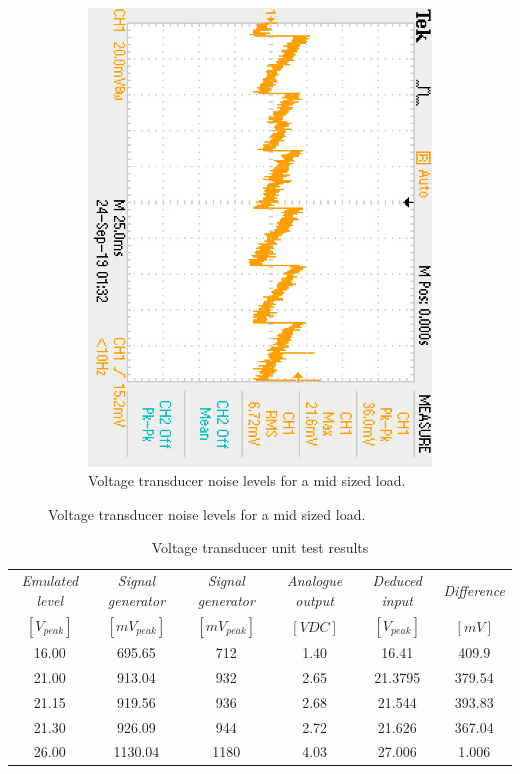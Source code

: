 \begin{figure}
\begin{subfigure}[]{0.45\textwidth}
  		\includegraphics[height=1\linewidth,angle=90]{./Figures/voltage_noise_measure}
		    \caption{Voltage transducer noise levels for a mid sized load.} \label{subfig:voltage_noise}
     \end{subfigure}
 \end{figure}
 
\begin{table}[h]
        \centering
        \footnotesize
        \caption{Voltage transducer unit test results}
         \begin{tabular}{cccccc}
          \toprule
             \textit{\footnotesize Emulated level} & \textit{\footnotesize Signal generator} & \textit{\footnotesize Signal generator} & \textit{{\footnotesize Analogue output}} & \textit{\footnotesize Deduced input} & \textit{\footnotesize Difference}\\
             $[V_{peak}]$ & $[mV_{peak}]$ & $[mV_{peak}]$ & $[VDC]$ & $[V_{peak}]$ & $[mV]$ \\
          \midrule
          16.00 & 695.65 & 712 & 1.40 & 16.41 & 409.9 \\
          21.00 & 913.04 & 932 & 2.65 & 21.3795 & 379.54 \\
          21.15 & 919.56 & 936 & 2.68 & 21.544 & 393.83 \\
          21.30 & 926.09 & 944 & 2.72 & 21.626 & 367.04 \\
          26.00 & 1130.04 & 1180 & 4.03 & 27.006 & 1.006 \\
          \bottomrule
        \end{tabular}
     \label{tab:voltage_unit_test}
\end{table}

